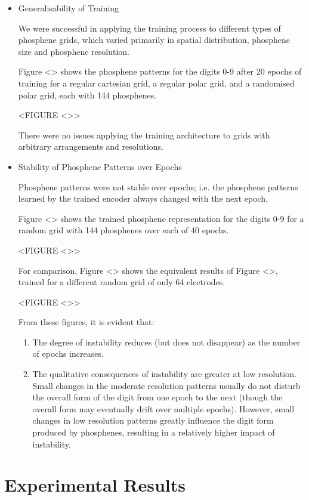 \documentclass[11pt]{book}
\begin{document}
\begin{itemize}
\item Generalisability of Training
\label{sec:orge0af37b}

We were successful in applying the training process to different types of phosphene grids, which varied primarily in spatial distribution, phosphene size and phosphene resolution.

Figure <> shows the phosphene patterns for the digits 0-9 after 20 epochs of training for a regular cartesian grid, a regular polar grid, and a randomised polar grid, each with 144 phosphenes.

<FIGURE <>>

There were no issues applying the training architecture to grids with arbitrary arrangements and resolutions.

\item Stability of Phosphene Patterns over Epochs
\label{sec:org3685ede}

Phosphene patterns were not stable over epochs; i.e. the phosphene patterns learned by the trained encoder always changed with the next epoch.

Figure <> shows the trained phosphene representation for the digits 0-9 for a random grid with 144 phosphenes over each of 40 epochs.

<FIGURE <>>

For comparison, Figure <> shows the equivalent results of Figure <>, trained for a different random grid of only 64 electrodes.

<FIGURE <>>

From these figures, it is evident that:

\begin{enumerate}
\item The degree of instability reduces (but does not disappear) as the number of epochs increases.
\item The qualitative consequences of instability are greater at low resolution.
Small changes in the moderate resolution patterns usually do not disturb the overall form of the digit from one epoch to the next (though the overall form may eventually drift over multiple epochs).
However, small changes in low resolution patterns greatly influence the digit form produced by phosphenes, resulting in a relatively higher impact of instability.
\end{enumerate}
\end{itemize}

\section*{Experimental Results}
\label{sec:org5e02e33}
\end{document}

